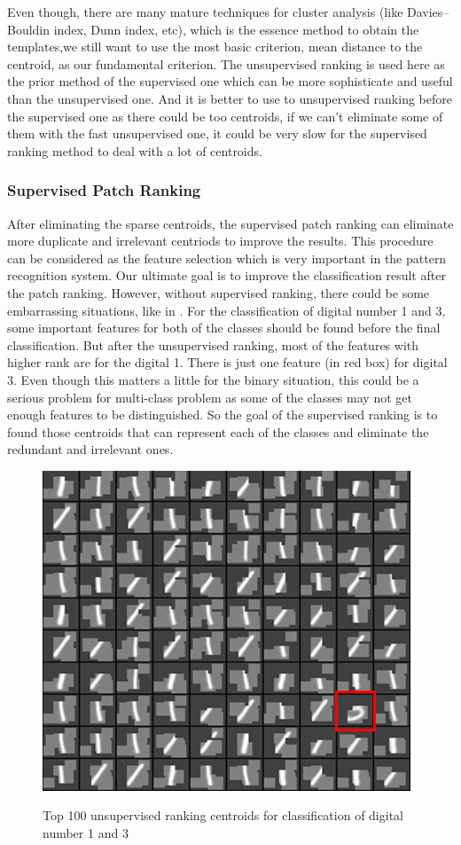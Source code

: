 Even though, there are many mature techniques for cluster analysis (like Davies–Bouldin index\cite{davies1979cluster}, Dunn index\cite{dunn1973fuzzy}, etc), which is the essence method to obtain the templates,we still want to use the most basic criterion, mean distance to the centroid, as our fundamental criterion. The unsupervised ranking is used here as the prior method of the supervised one which can be more sophisticate and useful than the unsupervised one. And it is better to use to unsupervised ranking before the supervised one as there could be too centroids, if we can't eliminate some of them with the fast unsupervised one, it could be very slow for the supervised ranking method to deal with a lot of centroids.

\subsubsection{Supervised Patch Ranking}
After eliminating the sparse centroids, the supervised patch ranking can eliminate more duplicate and irrelevant centriods to improve the results. This procedure can be considered as the feature selection which is very important in the pattern recognition system. Our ultimate goal is to improve the classification result after the patch ranking. However, without supervised ranking, there could be some embarrassing situations, like in . For the classification of digital number 1 and 3, some important features for both of the classes should be found before the final classification. But after the unsupervised ranking, most of the features with higher rank are for the digital 1. There is just one feature (in red box) for digital 3. Even though this matters a little for the binary situation, this could be a serious problem for multi-class problem as some of the classes may not get enough features to be distinguished. So the goal of the supervised ranking is to found those centroids that can represent each of the classes and eliminate the redundant and irrelevant ones.
\begin{figure}[H]
  \centering
  \includegraphics[scale = .5]{fig/100_unsup.png}\\
  \caption{Top 100 unsupervised ranking centroids for classification of digital number 1 and 3}\label{fig:unsup_100}
\end{figure}
